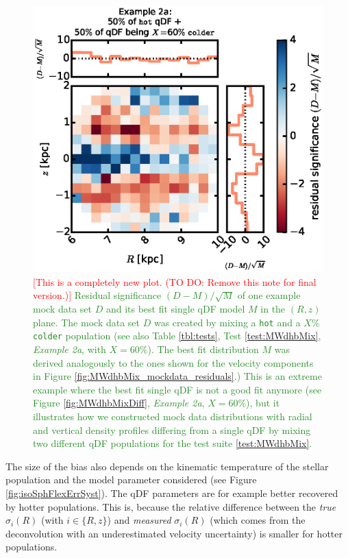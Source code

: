 \documentclass[iop,revtex4]{emulateapj}
\newcommand{\NEW}[1]{\textcolor{ForestGreen}{#1}}
\newcommand{\NOTE}[1]{\textcolor{Red}{#1}}
\begin{document}
\begin{figure}[!htbp]
\centering
\includegraphics[width=\columnwidth]{figs/MWbdhMixDiff_hot_2kpc_0.6_a_residual_RvsZ.eps}
\caption{\NOTE{[This is a completely new plot. (TO DO: Remove this note for final version.)]} \NEW{Residual significance $(D-M)/\sqrt{M}$ of one example mock data set $D$ and its best fit single qDF model $M$ in the $(R,z)$ plane. The mock data set $D$ was created by mixing a \texttt{hot} and a $X\%$ \texttt{colder} population (see also Table \ref{tbl:tests}, Test \ref{test:MWdhbMix}, \emph{Example 2a}, with $X=60\%$). The best fit distribution $M$ was derived analogously to the ones shown for the velocity components in Figure \ref{fig:MWdhbMix_mockdata_residuals}.) This is an extreme example where the best fit single qDF is not a good fit anymore (see Figure \ref{fig:MWdhbMixDiff}, \emph{Example 2a}, $X=60\%$), but it illustrates how we constructed mock data distributions with radial and vertical density profiles differing from a single qDF by mixing two different qDF populations for the test suite \ref{test:MWdhbMix}.}}
\label{fig:MWbdhMix_residual_RvsZ}
\end{figure}

The size of the bias also depends on the kinematic temperature of the stellar population and the model parameter considered (see Figure \ref{fig:isoSphFlexErrSyst}). The qDF parameters are for example better recovered by hotter populations. This is, because the relative difference between the \emph{true} $\sigma_i(R)$ (with $i \in \{R,z\}$) and \emph{measured} $\sigma_i(R)$ (which comes from the deconvolution with an underestimated velocity uncertainty) is smaller for hotter populations. 
\end{document}
